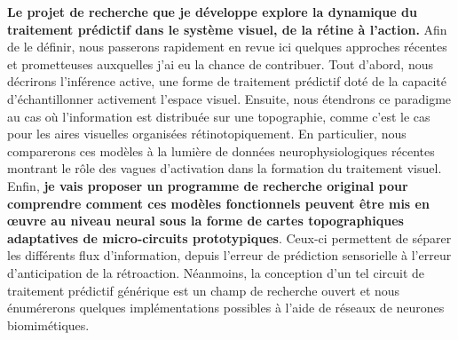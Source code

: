 \textbf{Le projet de recherche que je développe
explore la dynamique du traitement prédictif dans le système visuel,
de la rétine à l'action.}
Afin de le définir, nous passerons rapidement en revue ici quelques approches récentes et
prometteuses auxquelles j'ai eu la chance de contribuer. Tout d'abord, nous décrirons l'inférence active, une forme
de traitement prédictif doté de la capacité d'échantillonner activement
l'espace visuel. Ensuite, nous étendrons ce paradigme au cas où
l'information est distribuée sur une topographie, comme c'est le cas
pour les aires visuelles organisées rétinotopiquement. En particulier,
nous comparerons ces modèles à la lumière de données neurophysiologiques
récentes montrant le rôle des vagues d'activation dans la formation du
traitement visuel. Enfin, \textbf{je vais proposer un programme de recherche original
pour comprendre comment ces modèles fonctionnels peuvent être mis en
œuvre au niveau neural sous la forme de cartes topographiques adaptatives de micro-circuits
prototypiques}. Ceux-ci permettent de séparer les différents flux
d'information, depuis l'erreur de prédiction sensorielle à l'erreur d'anticipation de la rétroaction.
Néanmoins, la conception d'un tel
circuit de traitement prédictif générique est un champ de recherche ouvert et nous énumérerons quelques implémentations possibles à l'aide
de réseaux de neurones biomimétiques.

